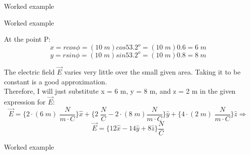 {\begin{frame}{Worked example}
\end{frame}

%
%
%

\begin{frame}{Worked example}

  At the point P:
  \begin{equation*}
     x = r  cos\phi = (10 \; m)  cos53.2^o = (10 \; m)  0.6 = 6 \; m
  \end{equation*}
  \begin{equation*}
     y = r  sin\phi = (10 \; m)  sin53.2^o = (10 \; m)  0.8 = 8 \; m
  \end{equation*}

  \vspace{0.2cm}

  The electric field $\vec{E}$ varies very little over the small given area.
  Taking it to be constant is a good approximation.\\
  Therefore, I will just substitute x = 6 m, y = 8 m, and z = 2 m
  in the given expression for $\vec{E}$:
  \begin{equation*}
   \vec{E} =
     \big\{ 2 \cdot (6\; m) \; \frac{N}{m \cdot C} \big\} \hat{x} +
     \big\{ 2 \; \frac{N}{C} - 2 \cdot (8 \; m) \frac{N}{m \cdot C} \big\} \hat{y} +
     \big\{ 4 \cdot (2\;m) \; \frac{N}{m \cdot C} \big\} \hat{z} \Rightarrow
  \end{equation*}
  \begin{equation*}
   \vec{E} =
   \big\{ 12 \hat{x} - 14 \hat{y} + 8 \hat{z} \big\} \frac{N}{C}
 \end{equation*}

\end{frame}

%
%
%

\begin{frame}{Worked example}


\end{frame}}
